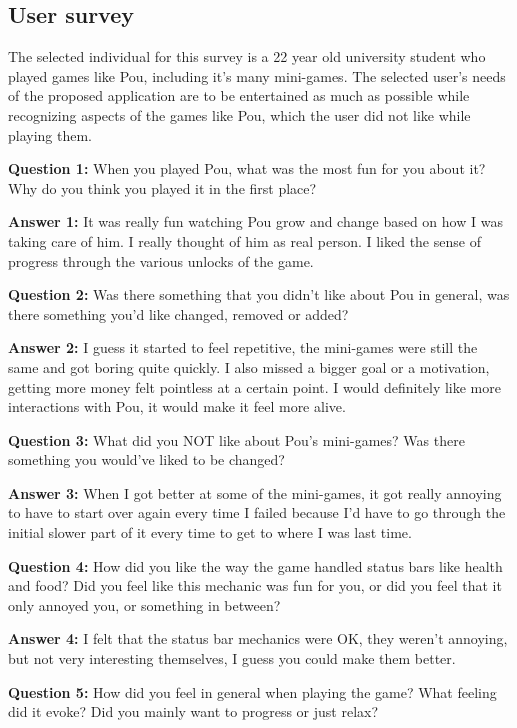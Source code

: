 \documentclass[11pt]{article}
\begin{document}
\subsection{User survey}
   The selected individual for this survey is a 22 year old university student who played games like Pou, including it's many mini-games. The selected user's needs of the proposed application are to be entertained as much as possible while recognizing aspects of the games like Pou, which the user did not like while playing them.

    \textbf{Question 1:} When you played Pou, what was the most fun for you about it? Why do you think you played it in the first place?

    \textbf{Answer 1:} It was really fun watching Pou grow and change based on how I was taking care of him. I really thought of him as real person. I liked the sense of progress through the various unlocks of the game.

    \textbf{Question 2:} Was there something that you didn't like about Pou in general, was there something you'd like changed, removed or added?

    \textbf{Answer 2:} I guess it started to feel repetitive, the mini-games were still the same and got boring quite quickly. I also missed a bigger goal or a motivation, getting more money felt pointless at a certain point. I would definitely like more interactions with Pou, it would make it feel more alive.

    \textbf{Question 3:} What did you NOT like about Pou's mini-games? Was there something you would've liked to be changed?
    
    \textbf{Answer 3:} When I got better at some of the mini-games, it got really annoying to have to start over again every time I failed because I'd have to go through the initial slower part of it every time to get to where I was last time.
    
    \textbf{Question 4:} How did you like the way the game handled status bars like health and food? Did you feel like this mechanic was fun for you, or did you feel that it only annoyed you, or something in between?
    
    \textbf{Answer 4:} I felt that the status bar mechanics were OK, they weren't annoying, but not very interesting themselves, I guess you could make them better.

    \textbf{Question 5:} How did you feel in general when playing the game? What feeling did it evoke? Did you mainly want to progress or just relax?
\end{document}
